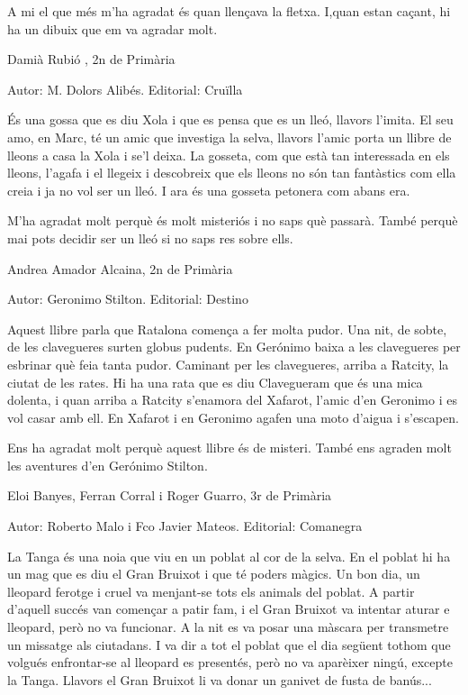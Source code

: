 \begin{shortnews}
{A mi el que més m’ha agradat és quan llençava la fletxa. I,quan estan caçant, hi ha un dibuix que em va agradar molt.

Damià Rubió ,  2n de Primària
}

{
Autor: M. Dolors Alibés.   Editorial: Cruïlla

És una gossa que es diu Xola i que es pensa que es un lleó, llavors l’imita. El seu amo,  en Marc, té un amic que investiga la selva, llavors l’amic porta un llibre de lleons a casa la Xola i se’l deixa. La gosseta, com que està tan interessada en els lleons, l’agafa i el llegeix i descobreix que els lleons no són tan fantàstics com ella creia i ja no vol ser un lleó. I ara és una gosseta petonera com abans era.

M’ha agradat molt perquè és molt misteriós i no saps què passarà. També perquè mai  pots decidir ser un lleó si no saps res sobre ells.

Andrea Amador Alcaina,  2n de Primària
}

{
Autor: Geronimo Stilton.   Editorial: Destino

Aquest llibre parla que Ratalona comença a fer molta pudor. Una nit, de sobte,  de les clavegueres surten globus pudents. En Gerónimo baixa a les clavegueres per esbrinar què feia tanta pudor. Caminant per les clavegueres, arriba a Ratcity, la ciutat de les rates. Hi ha una rata que es diu Clavegueram que és una mica dolenta, i quan arriba a Ratcity s’enamora del Xafarot, l’amic d’en Geronimo i es vol casar amb ell. En Xafarot i en Geronimo agafen una moto d’aigua i s’escapen.

Ens ha agradat molt perquè aquest llibre és de misteri. També ens agraden molt les aventures d’en Gerónimo Stilton.

Eloi Banyes, Ferran Corral i Roger Guarro, 3r de Primària
}


{
Autor: Roberto Malo i Fco Javier Mateos.  Editorial: Comanegra

La Tanga és una noia que viu en un poblat al cor de la selva. En el poblat hi ha un mag que es diu el Gran Bruixot i que té poders màgics. Un bon dia, un lleopard ferotge i cruel va menjant-se tots els animals del poblat. A partir d’aquell succés van començar a patir fam, i el Gran Bruixot va intentar aturar e lleopard, però no va funcionar. A la nit es va posar una màscara per transmetre un missatge als ciutadans. I va dir a tot el poblat que el dia següent tothom que volgués enfrontar-se al lleopard es presentés, però no va aparèixer ningú, excepte la Tanga. Llavors el Gran Bruixot li va donar un ganivet de fusta de banús... 

}
\end{shortnews}
